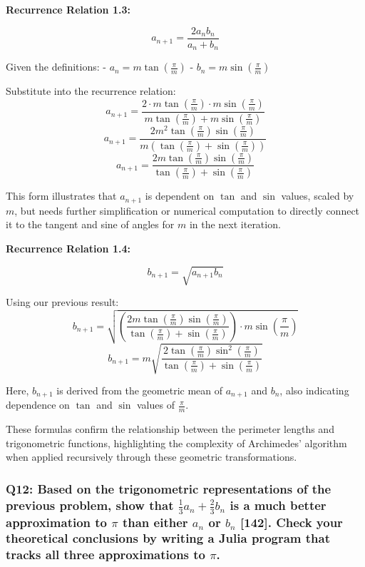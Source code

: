 \documentclass[8pt]{article}
\begin{document}
\textbf{Recurrence Relation 1.3:}

\[ a_{n+1} = \frac{2a_nb_n}{a_n + b_n} \]

Given the definitions:
- \( a_n = m \tan \left( \frac{\pi}{m} \right) \)
- \( b_n = m \sin \left( \frac{\pi}{m} \right) \)

Substitute into the recurrence relation:
\[ a_{n+1} = \frac{2 \cdot m \tan \left( \frac{\pi}{m} \right) \cdot m \sin \left( \frac{\pi}{m} \right)}{m \tan \left( \frac{\pi}{m} \right) + m \sin \left( \frac{\pi}{m} \right)} \]
\[ a_{n+1} = \frac{2m^2 \tan \left( \frac{\pi}{m} \right) \sin \left( \frac{\pi}{m} \right)}{m \left(\tan \left( \frac{\pi}{m} \right) + \sin \left( \frac{\pi}{m} \right)\right)} \]
\[ a_{n+1} = \frac{2m \tan \left( \frac{\pi}{m} \right) \sin \left( \frac{\pi}{m} \right)}{\tan \left( \frac{\pi}{m} \right) + \sin \left( \frac{\pi}{m} \right)} \]

This form illustrates that \( a_{n+1} \) is dependent on \( \tan \) and \( \sin \) values, scaled by \( m \), but needs further simplification or numerical computation to directly connect it to the tangent and sine of angles for \( m \) in the next iteration.

\textbf{Recurrence Relation 1.4:}

\[ b_{n+1} = \sqrt{a_{n+1}b_n} \]

Using our previous result:
\[ b_{n+1} = \sqrt{\left(\frac{2m \tan \left( \frac{\pi}{m} \right) \sin \left( \frac{\pi}{m} \right)}{\tan \left( \frac{\pi}{m} \right) + \sin \left( \frac{\pi}{m} \right)}\right) \cdot m \sin \left( \frac{\pi}{m} \right)} \]
\[ b_{n+1} = m \sqrt{\frac{2 \tan \left( \frac{\pi}{m} \right) \sin^2 \left( \frac{\pi}{m} \right)}{\tan \left( \frac{\pi}{m} \right) + \sin \left( \frac{\pi}{m} \right)}} \]

Here, \( b_{n+1} \) is derived from the geometric mean of \( a_{n+1} \) and \( b_n \), also indicating dependence on \( \tan \) and \( \sin \) values of \( \frac{\pi}{m} \). 

These formulas confirm the relationship between the perimeter lengths and trigonometric functions, highlighting the complexity of Archimedes' algorithm when applied recursively through these geometric transformations.

\subsubsection*{Q12: Based on the trigonometric representations of the previous problem, show that $\frac{1}{3}a_n + \frac{2}{3}b_n$ is a much better approximation to $\pi$ than either $a_n$ or $b_n$ [142]. Check your theoretical conclusions by writing a Julia program that tracks all three approximations to $\pi$.}
\end{document}
